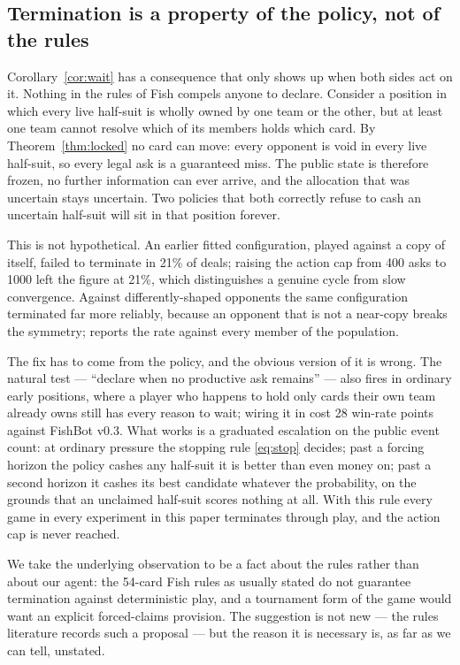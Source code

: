 \subsection{Termination is a property of the policy, not of the rules}
\label{sec:termination}

Corollary~\ref{cor:wait} has a consequence that only shows up when both sides
act on it. Nothing in the rules of Fish compels anyone to declare. Consider a
position in which every live half-suit is wholly owned by one team or the other,
but at least one team cannot resolve which of its members holds which card. By
Theorem~\ref{thm:locked} no card can move: every opponent is void in every live
half-suit, so every legal ask is a guaranteed miss. The public state is
therefore frozen, no further information can ever arrive, and the allocation that
was uncertain stays uncertain. Two policies that both correctly refuse to cash an
uncertain half-suit will sit in that position forever.

This is not hypothetical. An earlier fitted configuration, played against a copy
of itself, failed to terminate in 21\% of deals; raising the action cap from 400
asks to 1000 left the figure at 21\%, which distinguishes a genuine cycle from
slow convergence. Against differently-shaped opponents the same configuration terminated far more
reliably, because an opponent that is not a near-copy breaks the symmetry;
 reports the rate against every
member of the population.

The fix has to come from the policy, and the obvious version of it is wrong. The
natural test --- ``declare when no productive ask remains'' --- also fires in
ordinary early positions, where a player who happens to hold only cards their own
team already owns still has every reason to wait; wiring it in cost 28 win-rate
points against FishBot v0.3. What works is a graduated escalation on the public
event count: at ordinary pressure the stopping rule \eqref{eq:stop} decides; past
a forcing horizon the policy cashes any half-suit it is better than even money
on; past a second horizon it cashes its best candidate whatever the probability,
on the grounds that an unclaimed half-suit scores nothing at all. With this rule
every game in every experiment in this paper terminates through play, and the
action cap is never reached.

We take the underlying observation to be a fact about the rules rather than about
our agent: the 54-card Fish rules as usually stated do not guarantee termination
against deterministic play, and a tournament form of the game would want an
explicit forced-claims provision. The suggestion is not new --- the rules
literature records such a proposal \cite{pagat} --- but the reason it is
necessary is, as far as we can tell, unstated.
